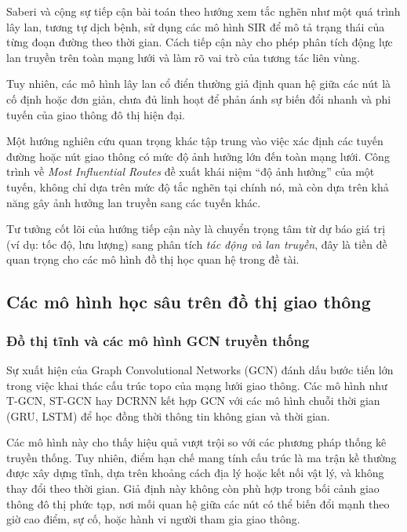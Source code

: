 
Saberi và cộng sự tiếp cận bài toán theo hướng xem tắc nghẽn như một quá trình lây lan, tương tự dịch bệnh, sử dụng các mô hình SIR để mô tả trạng thái của từng đoạn đường theo thời gian. Cách tiếp cận này cho phép phân tích động lực lan truyền trên toàn mạng lưới và làm rõ vai trò của tương tác liên vùng.

Tuy nhiên, các mô hình lây lan cổ điển thường giả định quan hệ giữa các nút là cố định hoặc đơn giản, chưa đủ linh hoạt để phản ánh sự biến đổi nhanh và phi tuyến của giao thông đô thị hiện đại.


Một hướng nghiên cứu quan trọng khác tập trung vào việc xác định các tuyến đường hoặc nút giao thông có mức độ ảnh hưởng lớn đến toàn mạng lưới. Công trình về \textit{Most Influential Routes} đề xuất khái niệm ``độ ảnh hưởng'' của một tuyến, không chỉ dựa trên mức độ tắc nghẽn tại chính nó, mà còn dựa trên khả năng gây ảnh hưởng lan truyền sang các tuyến khác.

Tư tưởng cốt lõi của hướng tiếp cận này là chuyển trọng tâm từ dự báo giá trị (ví dụ: tốc độ, lưu lượng) sang phân tích \emph{tác động và lan truyền}, đây là tiền đề quan trọng cho các mô hình đồ thị học quan hệ trong đề tài.

\subsection{Các mô hình học sâu trên đồ thị giao thông}

\subsubsection{Đồ thị tĩnh và các mô hình GCN truyền thống}

Sự xuất hiện của Graph Convolutional Networks (GCN) đánh dấu bước tiến lớn trong việc khai thác cấu trúc topo của mạng lưới giao thông. Các mô hình như T-GCN, ST-GCN hay DCRNN kết hợp GCN với các mô hình chuỗi thời gian (GRU, LSTM) để học đồng thời thông tin không gian và thời gian.

Các mô hình này cho thấy hiệu quả vượt trội so với các phương pháp thống kê truyền thống. Tuy nhiên, điểm hạn chế mang tính cấu trúc là ma trận kề thường được xây dựng tĩnh, dựa trên khoảng cách địa lý hoặc kết nối vật lý, và không thay đổi theo thời gian. Giả định này không còn phù hợp trong bối cảnh giao thông đô thị phức tạp, nơi mối quan hệ giữa các nút có thể biến đổi mạnh theo giờ cao điểm, sự cố, hoặc hành vi người tham gia giao thông.

